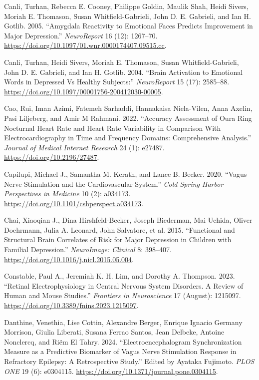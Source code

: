 \documentclass[
  Letterpaper,
]{scrbook}
\newlength{\cslhangindent}
\newenvironment{CSLReferences}[2] %
 {\begin{list}{}{%
  \setlength{\itemindent}{0pt}
  \setlength{\leftmargin}{0pt}
  \setlength{\parsep}{0pt}
  \ifodd #1
   \setlength{\leftmargin}{\cslhangindent}
   \setlength{\itemindent}{-1\cslhangindent}
  \fi
  \setlength{\itemsep}{#2\baselineskip}}}
 {\end{list}}
\begin{document}
\begin{CSLReferences}{1}{0}
Canli, Turhan, Rebecca E. Cooney, Philippe Goldin, Maulik Shah, Heidi
Sivers, Moriah E. Thomason, Susan Whitfield-Gabrieli, John D. E.
Gabrieli, and Ian H. Gotlib. 2005. {``Amygdala Reactivity to Emotional
Faces Predicts Improvement in Major Depression.''} \emph{NeuroReport} 16
(12): 1267--70.
\url{https://doi.org/10.1097/01.wnr.0000174407.09515.cc}.

Canli, Turhan, Heidi Sivers, Moriah E. Thomason, Susan
Whitfield-Gabrieli, John D. E. Gabrieli, and Ian H. Gotlib. 2004.
{``Brain Activation to Emotional Words in Depressed Vs Healthy
Subjects:''} \emph{NeuroReport} 15 (17): 2585--88.
\url{https://doi.org/10.1097/00001756-200412030-00005}.

Cao, Rui, Iman Azimi, Fatemeh Sarhaddi, Hannakaisa Niela-Vilen, Anna
Axelin, Pasi Liljeberg, and Amir M Rahmani. 2022. {``Accuracy
{Assessment} of {Oura Ring Nocturnal Heart Rate} and {Heart Rate
Variability} in {Comparison With Electrocardiography} in {Time} and
{Frequency Domains}: {Comprehensive Analysis}.''} \emph{Journal of
Medical Internet Research} 24 (1): e27487.
\url{https://doi.org/10.2196/27487}.

Capilupi, Michael J., Samantha M. Kerath, and Lance B. Becker. 2020.
{``Vagus {Nerve Stimulation} and the {Cardiovascular System}.''}
\emph{Cold Spring Harbor Perspectives in Medicine} 10 (2): a034173.
\url{https://doi.org/10.1101/cshperspect.a034173}.

Chai, Xiaoqian J., Dina Hirshfeld-Becker, Joseph Biederman, Mai Uchida,
Oliver Doehrmann, Julia A. Leonard, John Salvatore, et al. 2015.
{``Functional and Structural Brain Correlates of Risk for Major
Depression in Children with Familial Depression.''} \emph{NeuroImage:
Clinical} 8: 398--407. \url{https://doi.org/10.1016/j.nicl.2015.05.004}.

Constable, Paul A., Jeremiah K. H. Lim, and Dorothy A. Thompson. 2023.
{``Retinal Electrophysiology in Central Nervous System Disorders. {A}
Review of Human and Mouse Studies.''} \emph{Frontiers in Neuroscience}
17 (August): 1215097. \url{https://doi.org/10.3389/fnins.2023.1215097}.

Danthine, Venethia, Lise Cottin, Alexandre Berger, Enrique Ignacio
Germany Morrison, Giulia Liberati, Susana Ferrao Santos, Jean Delbeke,
Antoine Nonclercq, and Riëm El Tahry. 2024. {``Electroencephalogram
Synchronization Measure as a Predictive Biomarker of {Vagus} Nerve
Stimulation Response in Refractory Epilepsy: {A} Retrospective Study.''}
Edited by Ayataka Fujimoto. \emph{PLOS ONE} 19 (6): e0304115.
\url{https://doi.org/10.1371/journal.pone.0304115}.


\end{CSLReferences}
\end{document}
